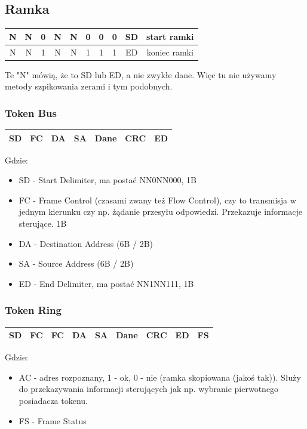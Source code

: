 \documentclass[a4paper,twoside]{article}
\begin{document}
		\subsection{Ramka}
			\begin{table}[h]
				\begin{tabular}{|c|c|c|c|c|c|c|c|cc}
					\hline
					N & N & 0 & N & N & 0 & 0 & 0 & SD & start ramki \\ \hline
					N & N & 1 & N & N & 1 & 1 & 1 & ED & koniec ramki \\ \hline
				\end{tabular}
			\end{table}
			Te "N" mówią, że to SD lub ED, a nie zwykłe dane. Więc tu nie używamy metody szpikowania zerami i tym podobnych.
			\subsubsection{Token Bus}
				\begin{table}[h]
					\begin{tabular}{|c|c|c|c|c|c|c|}
						\hline
						SD & FC & DA & SA & Dane & CRC & ED \\ \hline
					\end{tabular}
				\end{table}
				Gdzie:
				\begin{itemize}
					\item SD - Start Delimiter, ma postać NN0NN000, 1B
					\item FC - Frame Control (czasami zwany też Flow Control), czy to transmisja w jednym kierunku czy np. żądanie przesyłu odpowiedzi. Przekazuje informacje sterujące. 1B
					\item DA - Destination Address (6B / 2B)
					\item SA - Source Address (6B / 2B)
					\item ED - End Delimiter, ma postać NN1NN111, 1B
				\end{itemize}
			\subsubsection{Token Ring}
				\begin{table}[h]
					\begin{tabular}{|c|c|c|c|c|c|c|c|c|}
						\hline
						SD & FC & FC & DA & SA & Dane & CRC & ED & FS \\ \hline
					\end{tabular}
				\end{table}
				Gdzie:
				\begin{itemize}
					\item AC - adres rozpoznany, 1 - ok, 0 - nie (ramka skopiowana (jakoś tak)). Służy do przekazywania informacji sterujących jak np. wybranie pierwotnego posiadacza tokenu.
					\item FS - Frame Status
				\end{itemize}
\end{document}
